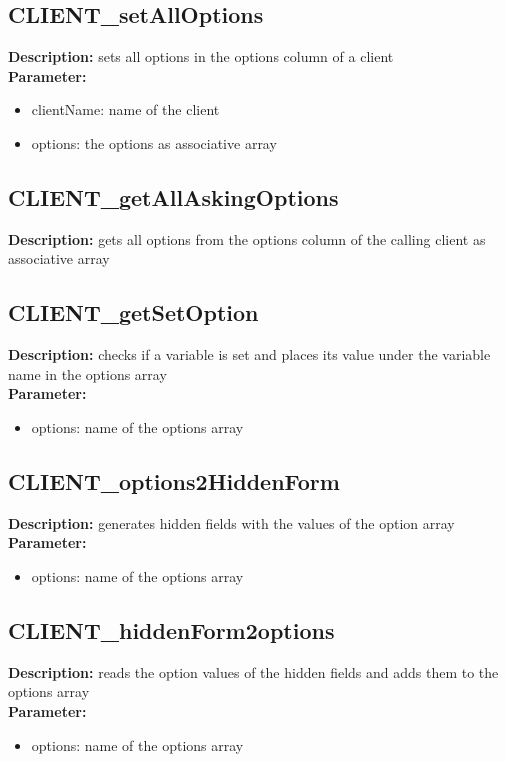 \subsection{CLIENT\_setAllOptions}
\textbf{Description:} sets all options in the options column of a client\\
\textbf{Parameter:}
\begin{itemize}
\item clientName: name of the client
\item options: the options as associative array
\end{itemize}

\subsection{CLIENT\_getAllAskingOptions}
\textbf{Description:} gets all options from the options column of the calling client as associative array\\

\subsection{CLIENT\_getSetOption}
\textbf{Description:} checks if a variable is set and places its value under the variable name in the options array\\
\textbf{Parameter:}
\begin{itemize}
\item options: name of the options array
\end{itemize}

\subsection{CLIENT\_options2HiddenForm}
\textbf{Description:} generates hidden fields with the values of the option array\\
\textbf{Parameter:}
\begin{itemize}
\item options: name of the options array
\end{itemize}

\subsection{CLIENT\_hiddenForm2options}
\textbf{Description:} reads the option values of the hidden fields and adds them to the options array\\
\textbf{Parameter:}
\begin{itemize}
\item options: name of the options array
\end{itemize}

